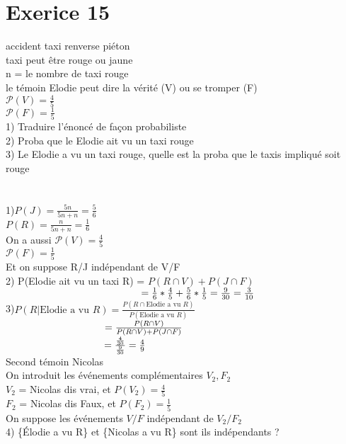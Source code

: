 \documentclass{article}
\author{Frederic Becerril}
\newcommand\tab[1][1cm]{\hspace*{#1}}
\begin{document}
\part*{Exerice 15}

accident taxi renverse piéton\\
taxi peut être rouge ou jaune\\
n = le nombre de taxi rouge\\
le témoin Elodie peut dire la vérité (V) ou se tromper (F)\\
$\mathcal{P}(V) = \frac{4}{5}$\\ 
$\mathcal{P}(F) = \frac{1}{5}$\\
1) Traduire l'énoncé de façon probabiliste\\
2) Proba que le Elodie ait vu un taxi rouge\\
3) Le Elodie a vu un taxi rouge, quelle est la proba que le taxis impliqué soit rouge\\
\\ \\
1)$P(J) = \frac{5n}{5n + n} = \frac{5}{6}$\\
$P(R) = \frac{n}{5n + n} = \frac{1}{6}$\\
On a aussi $\mathcal{P}(V) = \frac{4}{5}$\\ 
$\mathcal{P}(F) = \frac{1}{5}$\\
Et on suppose R/J indépendant de V/F\\
2) P(Elodie ait vu un taxi R) = $P(R \cap V) + P(J \cap F)$\\
$\tab[4.8cm] = \frac{1}{6} * \frac{4}{5} + \frac{5}{6} * \frac{1}{5} = \frac{9}{30} = \frac{3}{10}$\\
3)$P(R|\mbox{Elodie a vu } R) = \frac{P(R \cap \mbox{Elodie a vu } R)}{P(\mbox{Elodie a vu } R)}$\\
$\tab[3.5cm] = \frac{P(R \cap V)}{P(R \cap V) + P(J \cap F)}$\\
$\tab[3.5cm] = \frac{\frac{4}{30}}{\frac{9}{30}} = \frac{4}{9}$\\
\newpage
\noindent Second témoin Nicolas\\
On introduit les événements complémentaires $V_2, F_2$\\
$V_2$ = Nicolas dis vrai, et $P(V_2) = \frac{4}{5}$\\
$F_2$ = Nicolas dis Faux, et $P(F_2) = \frac{1}{5}$\\
On suppose les événements $V/F$ indépendant de $V_2/F_2$\\
4) \{Élodie a vu R\} et \{Nicolas a vu R\} sont ils indépendants ?\\
\end{document}
